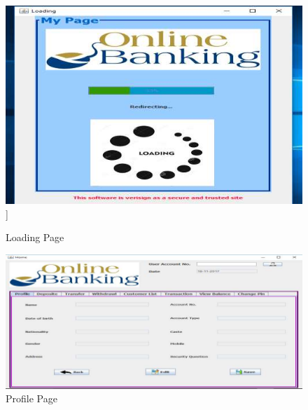 \begin{figure}[H]
\centering
\includegraphics[scale=.5]{./loadingPage.png}]
\caption{Loading Page}
\label{fig:Loading Page}
\end{figure}
\begin{figure}[H]
\centering
\includegraphics[scale=.5]{./profilePage.png}
\caption{Profile Page}
\label{fig:Profile Page}
\end{figure}
